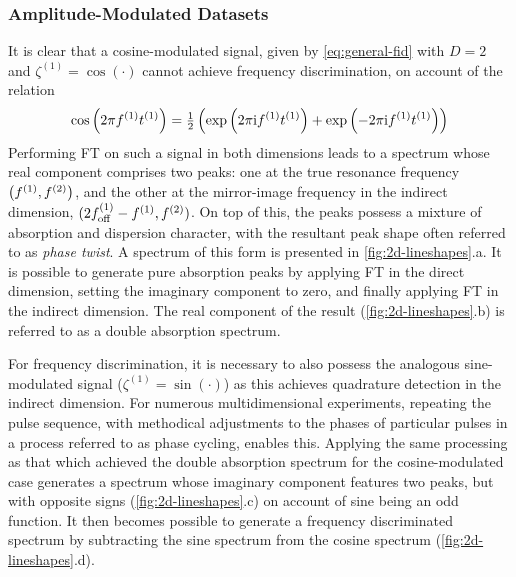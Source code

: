 \subsubsection{Amplitude-Modulated Datasets}
It is clear that a cosine-modulated signal, given by \cref{eq:general-fid}
with $D=2$ and $\zeta^{(1)} = \cos(\cdot)$ cannot achieve frequency
discrimination, on account of the relation
\begin{equation}
    \cos\left(2 \pi f^{(1)} t^{(1)}\right) =
    \tfrac{1}{2} \left(\exp\left(2 \pi \mathrm{i} f^{(1)} t^{(1)} \right) + \exp\left(-2 \pi \mathrm{i}
    f^{(1)} t^{(1)} \right)\right)
\end{equation}
Performing \ac{FT} on such a signal in both dimensions leads to a spectrum
whose real component comprises two peaks: one at the true resonance frequency
$\left(f^{(1)}, f^{(2)}\right)$, and the other at the mirror-image frequency in the
indirect dimension, $(2f_{\mathrm{off}}^{(1)} - f^{(1)}, f^{(2)})$. On top of this, the
peaks possess a mixture of absorption and dispersion character, with the
resultant peak shape often referred to as \emph{phase twist}\cite{Keeler1985}.
A spectrum of this form is presented in \cref{fig:2d-lineshapes}.a.
It is possible to generate pure absorption peaks by applying \ac{FT} in the
direct dimension, setting the imaginary component to zero, and finally
applying \ac{FT} in the indirect dimension. The real component of the result
(\cref{fig:2d-lineshapes}.b) is referred to as a double absorption spectrum.

For frequency discrimination, it is necessary to also possess the
analogous sine-modulated signal ($\zeta^{(1)} = \sin(\cdot)$) as this
achieves quadrature detection in the indirect dimension. For
numerous multidimensional experiments, repeating the
pulse sequence, with methodical adjustments to the phases of particular pulses
in a process referred to as phase cycling, enables
this\cite[Chapter 11]{Keeler2010}.
Applying the same processing as that which achieved the double absorption
spectrum for the cosine-modulated case generates a spectrum whose imaginary
component features two peaks, but with opposite signs
(\cref{fig:2d-lineshapes}.c) on account of sine being an odd function.
It then becomes possible to generate a frequency discriminated spectrum by
subtracting the sine spectrum from the cosine spectrum
(\cref{fig:2d-lineshapes}.d).

